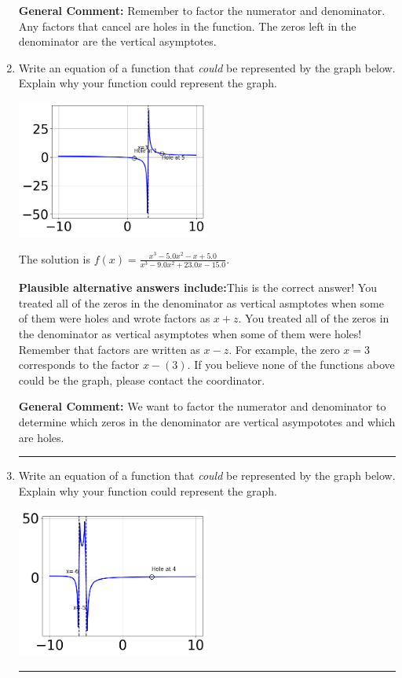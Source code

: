 \documentclass{extbook}[14pt]
\newcommand{\litem}[1]{\item #1

\rule{\textwidth}{0.4pt}}
\begin{document}
\begin{enumerate}
{\textbf{General Comment:} Remember to factor the numerator and denominator. Any factors that cancel are holes in the function. The zeros left in the denominator are the vertical asymptotes.
}
\litem{
Write an equation of a function that \textit{could} be represented by the graph below. Explain why your function could represent the graph.

\begin{center}
    \includegraphics[width=0.5\textwidth]{../Figures/identifyGraphOfRationalFunctionB.png}
\end{center}


The solution is \( f(x)=\frac{x^{3} -5.0 x^{2} -x + 5.0}{x^{3} -9.0 x^{2} +23.0 x -15.0} \).\begin{enumerate}[label=\Alph*.]
\textbf{Plausible alternative answers include:}This is the correct answer!
You treated all of the zeros in the denominator as vertical asmptotes when some of them were holes and wrote factors as $x+z$.
You treated all of the zeros in the denominator as vertical asymptotes when some of them were holes!
Remember that factors are written as $x-z$. For example, the zero $x=3$ corresponds to the factor $x-(3)$.
If you believe none of the functions above could be the graph, please contact the coordinator.
\end{enumerate}

\textbf{General Comment:} We want to factor the numerator and denominator to determine which zeros in the denominator are vertical asympototes and which are holes.
}
\litem{
Write an equation of a function that \textit{could} be represented by the graph below. Explain why your function could represent the graph.

\begin{center}
    \includegraphics[width=0.5\textwidth]{../Figures/identifyGraphOfRationalFunctionCopyB.png}
\end{center}


}
\end{enumerate}
\end{document}
